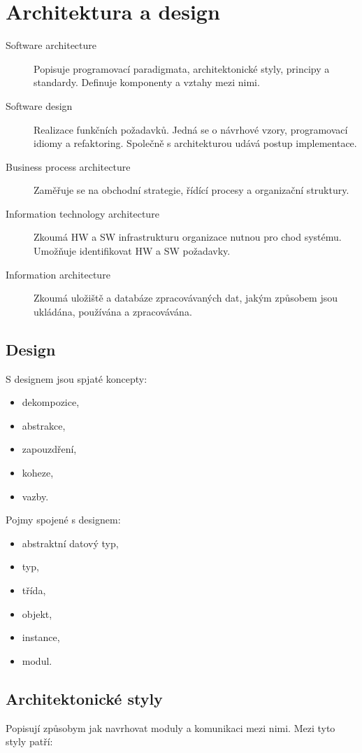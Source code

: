 \section{Architektura a design}
  \begin{description}
    \item[Software architecture] Popisuje programovací paradigmata,
    architektonické styly, principy a standardy. Definuje komponenty a vztahy mezi nimi.
    \item[Software design] Realizace funkčních požadavků. Jedná se o návrhové vzory, programovací idiomy
    a refaktoring. Společně s architekturou udává postup implementace.
    \item[Business process architecture] Zaměřuje se na obchodní strategie,
    řídící procesy a organizační struktury.
    \item[Information technology architecture] Zkoumá HW a SW infrastrukturu
    organizace nutnou pro chod systému. Umožňuje identifikovat HW a SW požadavky.
    \item[Information architecture] Zkoumá uložiště a databáze zpracovávaných
    dat, jakým způsobem jsou ukládána, používána a zpracovávána.
  \end{description}

  \subsection{Design}
    S designem jsou spjaté koncepty:
    \begin{itemize}
      \item dekompozice,
      \item abstrakce,
      \item zapouzdření,
      \item koheze,
      \item vazby.
    \end{itemize}

    Pojmy spojené s designem:
    \begin{itemize}
      \item abstraktní datový typ,
      \item typ,
      \item třída,
      \item objekt,
      \item instance,
      \item modul.
    \end{itemize}

  \subsection{Architektonické styly}
    Popisují způsobym jak navrhovat moduly a komunikaci mezi nimi. Mezi tyto styly patří:

